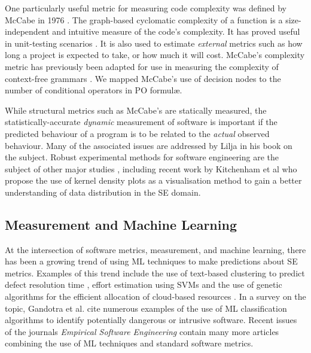 One particularly useful metric for measuring code complexity was defined by McCabe in 1976 \cite{McCabe}. The graph-based cyclomatic complexity of a function is a size-independent and intuitive measure of the code's complexity. It has proved useful in unit-testing scenarios \cite{McCabeTesting}. It is also used to estimate \textit{external} metrics such as how long a project is expected to take, or how much it will cost.  McCabe's complexity metric has previously been adapted for use in measuring the complexity of context-free grammars \cite{nuimeprn6458}. We mapped McCabe's use of decision nodes to the number of conditional operators in \why PO formul\ae.

While structural metrics such as McCabe's are statically measured, the statistically-accurate \textit{dynamic} measurement of software is important if the predicted behaviour of a program is to be related to the \textit{actual} observed behaviour. Many of the associated issues are addressed by Lilja \cite{LiljaJ} in his book on the subject. Robust experimental methods for software engineering are the subject of other major studies \cite{AdvancedESE}, including recent work by Kitchenham et al \cite{Kitchenham2016} who propose the use of kernel density plots as a visualisation method to gain a better understanding of data distribution in the SE domain.

\subsection{Measurement and Machine Learning}
\label{sub:lrmmml}

At the intersection of software metrics, measurement, and machine learning, there has been a growing trend of using ML techniques to make predictions about SE metrics. Examples of this trend include the use of text-based clustering to predict defect resolution time \cite{Assar2016}, effort estimation using SVMs \cite{Song:2014:PBR:2639490.2639510} and the use of genetic algorithms for the efficient allocation of cloud-based resources \cite{cloudML}. In a survey on the topic, Gandotra et al. \cite{ClassificationSurvey} cite numerous examples of the use of ML classification algorithms to identify potentially dangerous or intrusive software. Recent issues of the journals \textit{Empirical Software Engineering} contain many more articles combining the use of ML techniques and standard software metrics.  


